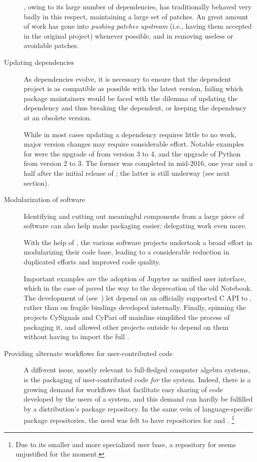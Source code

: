 \documentclass{deliverablereport}
\begin{document}
\begin{description}
  \Sage, owing to its large number of dependencies, has traditionally
  behaved very badly in this respect, maintaining a large set of
  patches. %
  An great amount of work has gone into \emph{pushing patches
    upstream} (i.e., having them accepted in the original project)
  whenever possible, and in removing useless or avoidable patches.
  
\item[Updating dependencies] As dependencies evolve, it is necessary
  to ensure that the dependent project is as compatible as possible
  with the latest version,
  failing which package maintainers would be faced with the dilemma
  of updating the dependency and thus breaking the dependent, or
  keeping the dependency at an obsolete version.

  While in most cases updating a dependency requires little to no
  work, major version changes may require considerable effort. %
  Notable examples for \Sage were the upgrade of \Singular from
  version 3 to 4, and the upgrade of Python from version 2 to 3. %
  The former was completed in mid-2016, one year and a half after the
  initial release of ; the latter is still underway (see
  next section).
  
\item[Modularization of \ODK software] Identifying and cutting out
  meaningful components from a large piece of software can also help
  make packaging easier; delegating work even more.

  With the help of \ODK, the various software projects undertook a
  broad effort in modularizing their code base, leading to a
  considerable reduction in duplicated efforts and improved code
  quality. %

  Important examples are the adoption of Jupyter as unified user
  interface, which in the case of \Sage paved the way to the
  deprecation of the old Notebook. %
  The development of \libGAP (see~) let
  \Sage depend on an officially supported C API to \GAP, rather than
  on fragile bindings developed internally. %
  Finally, spinning the projects CySignals and CyPari off mainline
  \Sage simplified the process of packaging it, and allowed other
  projects outside \ODK to depend on them without having to import the
  full \Sage.

\item[Providing alternate workflows for user-contributed code]
  A different issue, mostly relevant to full-fledged computer
  algebra systems, is the packaging of user-contributed code
  \emph{for} the system. %
  Indeed, there is a growing demand for workflows that facilitate easy
  sharing of code developed by the users of a system, and this demand can
  hardly be fulfilled by a distribution's package repository. %
  In the same vein of language-specific package repositories, the need
  was felt to have repositories for \Sage and \GAP.%
  \footnote{Due to its smaller and more specialized user base, a
    repository for \PariGP seems unjustified for the moment.} %
  

\end{description}
\end{document}
